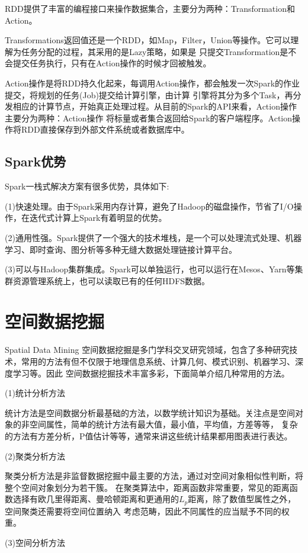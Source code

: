 RDD提供了丰富的编程接口来操作数据集合，主要分为两种：Transformation和Action。

Transformations返回值还是一个RDD，如Map，Filter，Union等操作。它可以理解为任务分配的过程，其采用的是Lazy策略，如果是
只提交Transformation是不会提交任务执行，只有在Action操作的时候才回被触发。

Action操作是将RDD持久化起来，每调用Action操作，都会触发一次Spark的作业提交，将规划的任务(Job)提交给计算引擎，由计算
引擎将其分为多个Task，再分发相应的计算节点，开始真正处理过程。从目前的Spark的API来看，Action操作主要分为两种：Action操作
将标量或者集合返回给Spark的客户端程序。Action操作将RDD直接保存到外部文件系统或者数据库中。
\subsection{Spark优势}
Spark一栈式解决方案有很多优势，具体如下:

(1)快速处理。由于Spark采用内存计算，避免了Hadoop的磁盘操作，节省了I/O操作，在迭代式计算上Spark有着明显的优势。

(2)通用性强。Spark提供了一个强大的技术堆栈，是一个可以处理流式处理、机器学习、即时查询、图分析等多种无缝大数据处理链接计算平台。

(3)可以与Hadoop集群集成。Spark可以单独运行，也可以运行在Mesos、Yarn等集群资源管理系统上，也可以读取已有的任何HDFS数据。
\section{空间数据挖掘}{Spatial Data Mining}
空间数据挖掘是多门学科交叉研究领域，包含了多种研究技术，常用的方法有但不仅限于地理信息系统、计算几何、模式识别、机器学习、深度学习等。因此
空间数据挖掘技术丰富多彩，下面简单介绍几种常用的方法。

(1)统计分析方法 

统计方法是空间数据分析最基础的方法，以数学统计知识为基础。关注点是空间对象的非空间属性，简单的统计方法有最大值，最小值，平均值，方差等等，
复杂的方法有方差分析，P值估计等等，通常来讲这些统计结果都用图表进行表达。

(2)聚类分析方法

聚类分析方法是非监督数据挖掘中最主要的方法，通过对空间对象相似性判断，将整个空间对象划分为若干簇\cite{杨春成2004空间数据挖掘中聚类分析算法的研究}。
在聚类算法中，距离函数非常重要，常见的距离函数选择有欧几里得距离、曼哈顿距离和更通用的$L_p$距离，除了数值型属性之外，空间聚类还需要将空间位置纳入
考虑范畴，因此不同属性的应当赋予不同的权重。

(3)空间分析方法

